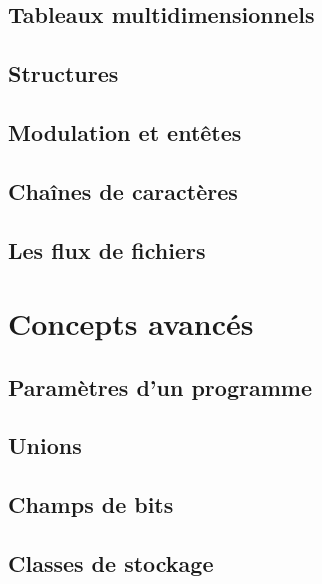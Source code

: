 \documentclass{minitelreport}
\begin{document}
\begin{refsection}
		\section{Tableaux multidimensionnels}
			\label{sec:tableaux_multidimensionnels}
			
		\section{Structures}
			\label{sec:structures}
			
		\section{Modulation et entêtes}
			\label{sec:modulation_et_entetes}
			
		\section{Chaînes de caractères}
			\label{sec:chaines_caracteres}
			
		\section{Les flux de fichiers}
			\label{sec:flux_fichiers}
			
	\chapter{Concepts avancés}
	\label{chap:concepts_avances}
		\section{Paramètres d'un programme}
			\label{sec:parametres_programme}
			
		\section{Unions}
			\label{sec:unions}
			
		\section{Champs de bits}
			\label{sec:champs_de_bits}
			
		\section{Classes de stockage}
			\label{sec:classes_de_stockage}
			

\end{refsection}
\end{document}
